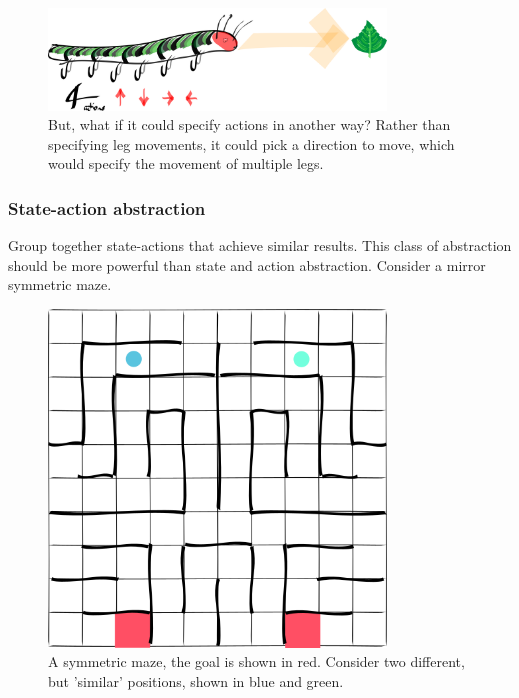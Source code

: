\begin{figure}[h!]
\centering
\includegraphics[width=0.8\textwidth,height=0.2\textheight]{../../pictures/drawings/full-caterpillar.png}
\caption{But, what if it could specify actions in another way? Rather than specifying leg movements, it could pick a direction to move, which would specify the movement of multiple legs.}
\end{figure}

\subsubsection{State-action abstraction}

Group together state-actions that achieve similar results. This class of abstraction
should be more powerful than state and action abstraction. Consider a mirror symmetric maze.

\begin{figure}[h!]
\centering
\includegraphics[width=0.8\textwidth,height=0.4\textheight]{../../pictures/drawings/maze.png}
\caption{A symmetric maze, the goal is shown in red.
Consider two different, but 'similar' positions, shown in blue and green.}
\end{figure}

